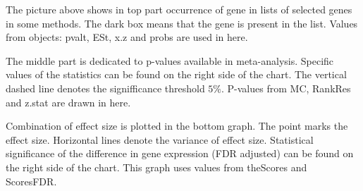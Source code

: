 \documentclass[a4paper]{report}
\begin{document}
The picture above shows in top part occurrence of gene in lists of selected genes in some methods.  The dark box means that the gene is present in the list. Values from objects: {\ttfamily pvalt}, {\ttfamily ESt}, {\ttfamily x.z} and {\ttfamily probs} are used in here. \par
The middle part is dedicated to p-values available in meta-analysis. Specific values of the statistics can be found on the right side of the chart. The vertical dashed line denotes the signifficance threshold $5\%$. P-values from {\ttfamily MC}, {\ttfamily RankRes} and {\ttfamily z.stat} are drawn in here.\par
Combination of effect size is plotted in the bottom graph. The point marks the effect size. Horizontal lines denote the variance of effect size. Statistical significance of the difference in gene expression (FDR adjusted) can be found on the right side of the chart. This graph uses values from {\ttfamily theScores} and {\ttfamily ScoresFDR}.
\end{document}

